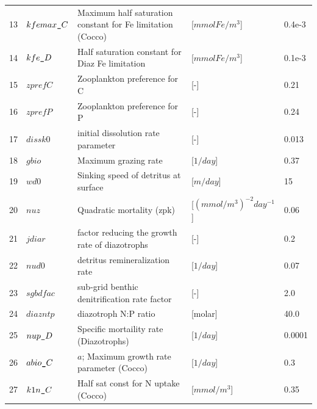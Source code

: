 \documentclass[a4paper]{article}
\begin{document}
\begin{itemize}
{\begin{longtable}{lllll}
   13  & $kfemax\verb|_|C$  & Maximum half saturation constant for Fe limitation (Cocco)  & [$mmol Fe / m^3$]             & 0.4e-3     \\
   14  & $kfe\verb|_|D$     & Half saturation constant for Diaz Fe limitation             & [$mmol Fe / m^3$]             & 0.1e-3     \\
   15  & $zprefC$           & Zooplankton preference for C                                & [-]                           & 0.21       \\
   16  & $zprefP$           & Zooplankton preference for P                                & [-]                           & 0.24       \\ 
   17  & $dissk0$           & initial dissolution rate parameter                          & [-]                           & 0.013      \\
   18  & $gbio$             &  Maximum grazing rate                                        & [$1/day$]                     & 0.37       \\
   19  & $wd0$              &  Sinking speed of detritus at surface                        & [$m/day$]                     & 15         \\
   20  & $nuz$              & Quadratic mortality (zpk)                                   & [$(mmol/m^3)^{-2}day^{-1}$]   & 0.06       \\
   21  & $jdiar$            & factor reducing the growth rate of diazotrophs              & [-]                           & 0.2        \\
   22  & $nud0$             & detritus remineralization rate                              & [$1/day$]                     & 0.07       \\
   23  & $sgbdfac$          & sub-grid benthic denitrification rate factor                & [-]                           & 2.0        \\
   24  & $diazntp$          & diazotroph N:P ratio                                        & [molar]                       & 40.0       \\
   25  & $nup\verb|_|D$     & Specific mortaility rate (Diazotrophs)                      & [$1/day$]                     & 0.0001     \\
   26  & $abio\verb|_|C$    & $a$; Maximum growth rate parameter (Cocco)                  & [$1/day$]                     & 0.3        \\
   27  & $k1n\verb|_|C$     & Half sat const for N uptake (Cocco)                         & [$mmol/m^3$]                  & 0.35       \\

\end{longtable}}
\end{itemize}
\end{document}

